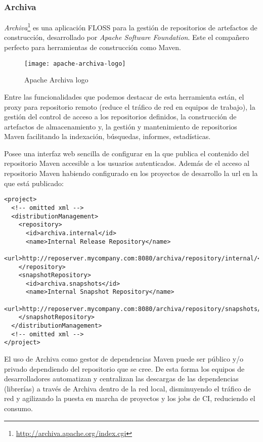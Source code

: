 
\subsubsection{Archiva}
\label{ssub:archiva}

\par \emph{Archiva}\footnote{\url{http://archiva.apache.org/index.cgi}} es una aplicación FLOSS para la gestión de repositorios de artefactos de construcción, desarrollado por \emph{Apache Software Foundation}. Este el compañero perfecto para herramientas de construcción como Maven.

\begin{figure}[H]
    \centering
    \texttt{[image: apache-archiva-logo]}
    \caption{Apache Archiva logo}
    \label{fi:apache-archiva}
\end{figure}

\par Entre las funcionalidades que podemos destacar de esta herramienta están, el proxy para repositorio remoto (reduce el tráfico de red en equipos de trabajo), la gestión del control de acceso a los repositorios definidos, la construcción de artefactos de almacenamiento y, la gestión y mantenimiento de repositorios Maven facilitando la indexación, búsquedas, informes, estadísticas.

\par Posee una interfaz web sencilla de configurar en la que publica el contenido del repositorio Maven accesible a los usuarios autenticados. Además de el acceso al repositorio Maven habiendo configurado en los proyectos de desarrollo la url en la que está publicado:

\lstset{style=xmlbasico}
\begin{lstlisting}[frame=trbl]
<project>
  <!-- omitted xml -->
  <distributionManagement>
    <repository>
      <id>archiva.internal</id>
      <name>Internal Release Repository</name>
      <url>http://reposerver.mycompany.com:8080/archiva/repository/internal/</url>
    </repository>
    <snapshotRepository>
      <id>archiva.snapshots</id>
      <name>Internal Snapshot Repository</name>
      <url>http://reposerver.mycompany.com:8080/archiva/repository/snapshots/</url>
    </snapshotRepository>
  </distributionManagement>
  <!-- omitted xml -->
</project>
\end{lstlisting}

\par El uso de Archiva como gestor de dependencias Maven puede ser público y/o privado dependiendo del repositorio que se cree. De esta forma los equipos de desarrolladores automatizan y centralizan las descargas de las dependencias (librerías) a través de Archiva dentro de la red local, disminuyendo el tráfico de red y agilizando la puesta en marcha de proyectos y los jobs de CI, reduciendo el consumo.


